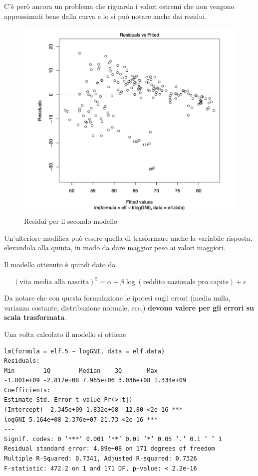C'è però ancora un problema che riguarda i valori estremi che non vengono approssimati bene dalla curva e lo si può notare anche dai residui.

\begin{figure}[htbp]
	\centering
	\includegraphics[width=.6\textwidth]{./notes/immagini/l7-fig9.png}
	\caption{Residui per il secondo modello }
\end{figure}

Un'ulteriore modifica può essere quella di trasformare anche la variabile risposta, elevandola alla quinta, in modo da dare maggior peso ai valori maggiori.

Il modello ottenuto è quindi dato da

$$
(\text{vita media alla nascita})^5 = \alpha + \beta \log(\text{reddito nazionale pro capite}) + \epsilon
$$

Da notare che con questa formulazione le ipotesi sugli errori (media nulla, varianza costante, distribuzione normale, ecc.) \textbf{devono valere per gli errori su scala trasformata}.

Una volta calcolato il modello si ottiene

\begin{verbatim}
lm(formula = elf.5 ~ logGNI, data = elf.data)
Residuals:
Min        1Q        Median    3Q       Max
-1.801e+09 -2.817e+08 7.965e+06 3.036e+08 1.334e+09
Coefficients:
Estimate Std. Error t value Pr(>|t|) 
(Intercept) -2.345e+09 1.832e+08 -12.80 <2e-16 *** 
logGNI 5.164e+08 2.376e+07 21.73 <2e-16 ***
---
Signif. codes: 0 ‘***’ 0.001 ‘**’ 0.01 ‘*’ 0.05 ‘.’ 0.1 ‘ ’ 1
Residual standard error: 4.89e+08 on 171 degrees of freedom 
Multiple R-Squared: 0.7341, Adjusted R-squared: 0.7326 
F-statistic: 472.2 on 1 and 171 DF, p-value: < 2.2e-16
\end{verbatim}

